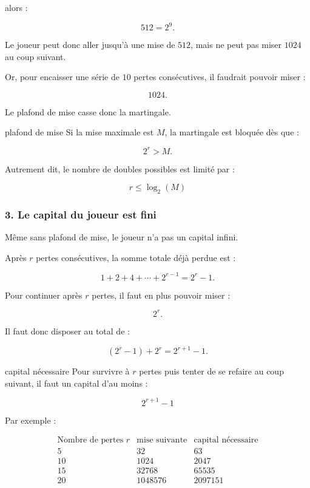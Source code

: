 \documentclass[11pt,a4paper]{article}
\begin{document}
alors :

\[
512=2^9.
\]

Le joueur peut donc aller jusqu'à une mise de \(512\), mais ne peut pas miser \(1024\) au coup suivant.

Or, pour encaisser une série de \(10\) pertes consécutives, il faudrait pouvoir miser :

\[
1024.
\]

Le plafond de mise casse donc la martingale.

\begin{equationbox}{plafond de mise}
Si la mise maximale est \(M\), la martingale est bloquée dès que :

\[
2^r > M.
\]

Autrement dit, le nombre de doubles possibles est limité par :

\[
\boxed{r\leq \log_2(M)}
\]
\end{equationbox}

\subsubsection*{3. Le capital du joueur est fini}

Même sans plafond de mise, le joueur n'a pas un capital infini.

Après \(r\) pertes consécutives, la somme totale déjà perdue est :

\[
1+2+4+\cdots+2^{r-1}=2^r-1.
\]

Pour continuer après \(r\) pertes, il faut en plus pouvoir miser :

\[
2^r.
\]

Il faut donc disposer au total de :

\[
(2^r-1)+2^r=2^{r+1}-1.
\]

\begin{equationbox}{capital nécessaire}
Pour survivre à \(r\) pertes puis tenter de se refaire au coup suivant, il faut un capital d'au moins :

\[
\boxed{2^{r+1}-1}
\]
\end{equationbox}

Par exemple :

\[
\begin{array}{c|c|c}
\text{Nombre de pertes }r & \text{mise suivante} & \text{capital nécessaire} \\
\hline
5 & 32 & 63 \\
10 & 1024 & 2047 \\
15 & 32768 & 65535 \\
20 & 1048576 & 2097151
\end{array}
\]
\end{document}
